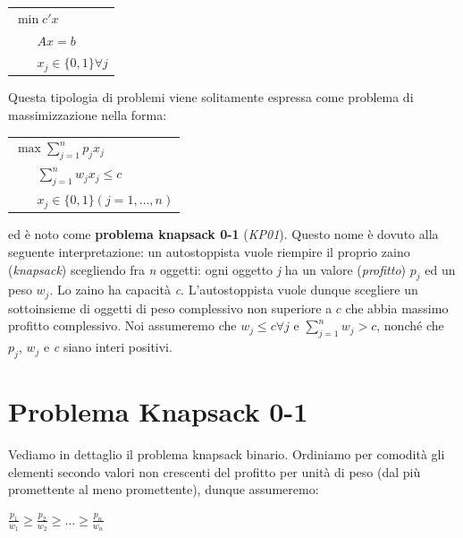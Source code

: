 \documentclass[11pt]{book}
\begin{document}
\vspace{11pt}
\begin{center}
  \begin{tabular}{l}
    $\min c'x$\\
    $\phantom{min}Ax = b$\\
    $\phantom{min}x_j \in \{ 0, 1\} \forall j$\\
  \end{tabular}
\end{center}
\vspace{11pt}

Questa tipologia di problemi viene solitamente espressa come problema
di massimizzazione nella forma:

\vspace{11pt}
\begin{center}
  \begin{tabular}{l}
    $\max \sum\limits_{j=1}^{n} p_jx_j$\\
    $\phantom{min}\sum\limits_{j=1}^n w_jx_j \leq c$\\
    $\phantom{min}x_j \in \{ 0, 1\} (j =1, \dots, n)$\\
  \end{tabular}
\end{center}
\vspace{11pt}

ed \`e noto come {\bf problema knapsack 0-1} ({\em KP01}). Questo nome
\`e dovuto alla seguente interpretazione: un autostoppista vuole
riempire il proprio zaino ({\em knapsack}) scegliendo fra {\em n}
oggetti: ogni oggetto {\em j} ha un valore ({\em profitto}) $p_j$ ed
un peso $w_j$. Lo zaino ha capacit\`a {\em c}. L'autostoppista vuole
dunque scegliere un sottoinsieme di oggetti di peso complessivo non
superiore a $c$ che abbia massimo profitto complessivo. Noi assumeremo
che $w_j \leq c \forall j$ e $\sum\limits_{j=1}^n w_j > c$, nonch\'e
che $p_j$, $w_j$ e {\em c} siano interi positivi.

\section{Problema Knapsack 0-1}

Vediamo in dettaglio il problema knapsack binario. Ordiniamo per
comodit\`a gli elementi secondo valori non crescenti del profitto per
unit\`a di peso (dal pi\`u promettente al meno promettente), dunque
assumeremo:

\begin{center}
$\frac{p_1}{w_1} \geq \frac{p_2}{w_2} \geq \dots \geq \frac{p_n}{w_n}$  
\end{center}
\end{document}
